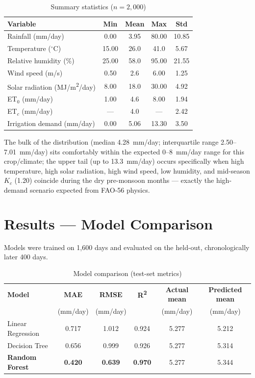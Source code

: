 \documentclass[11pt,a4paper]{article}
\begin{document}
\begin{table}[H]
\centering
\caption{Summary statistics ($n=2{,}000$)}
\label{tab:stats}
\begin{tabular}{@{}lcccc@{}}
\toprule
\textbf{Variable} & \textbf{Min} & \textbf{Mean} & \textbf{Max} & \textbf{Std} \\
\midrule
Rainfall (mm/day)                  & 0.00  & 3.95  & 80.00 & 10.85 \\
Temperature ($^\circ$C)            & 15.00 & 26.0  & 41.0  & 5.67  \\
Relative humidity (\%)             & 25.00 & 58.0  & 95.00 & 21.55 \\
Wind speed (m/s)                   & 0.50  & 2.6   & 6.00  & 1.25  \\
Solar radiation (MJ/m\textsuperscript{2}/day) & 8.00 & 18.0 & 30.00 & 4.92 \\
ET$_0$ (mm/day)                    & 1.00  & 4.6   & 8.00  & 1.94  \\
ET$_c$ (mm/day)                    & ---   & 4.0   & ---   & 2.42  \\
Irrigation demand (mm/day)         & 0.00  & 5.06  & 13.30 & 3.50  \\
\bottomrule
\end{tabular}
\end{table}

The bulk of the distribution (median 4.28~mm/day; interquartile range
2.50--7.01~mm/day) sits comfortably within the expected 0--8~mm/day range for
this crop/climate; the upper tail (up to 13.3~mm/day) occurs specifically when
high temperature, high solar radiation, high wind speed, low humidity, and
mid-season $K_c$ (1.20) coincide during the dry pre-monsoon months --- exactly
the high-demand scenario expected from FAO-56 physics.

\section{Results --- Model Comparison}

Models were trained on 1{,}600 days and evaluated on the held-out,
chronologically later 400 days.

\begin{table}[H]
\centering
\caption{Model comparison (test-set metrics)}
\label{tab:results}
\begin{tabular}{@{}lccccc@{}}
\toprule
\textbf{Model} & \textbf{MAE} & \textbf{RMSE} & \textbf{R\textsuperscript{2}} & \textbf{Actual mean} & \textbf{Predicted mean} \\
& (mm/day) & (mm/day) & & (mm/day) & (mm/day) \\
\midrule
Linear Regression & 0.717 & 1.012 & 0.924 & 5.277 & 5.212 \\
Decision Tree & 0.656 & 0.999 & 0.926 & 5.277 & 5.314 \\
\textbf{Random Forest} & \textbf{0.420} & \textbf{0.639} & \textbf{0.970} & 5.277 & 5.344 \\
\bottomrule
\end{tabular}
\end{table}
\end{document}
